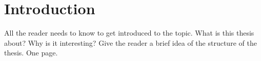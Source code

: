 \chapter{Introduction}
All the reader needs to know to get introduced to the topic. What is this thesis about? Why is it interesting? Give the reader a brief idea of the structure of the thesis. One page.